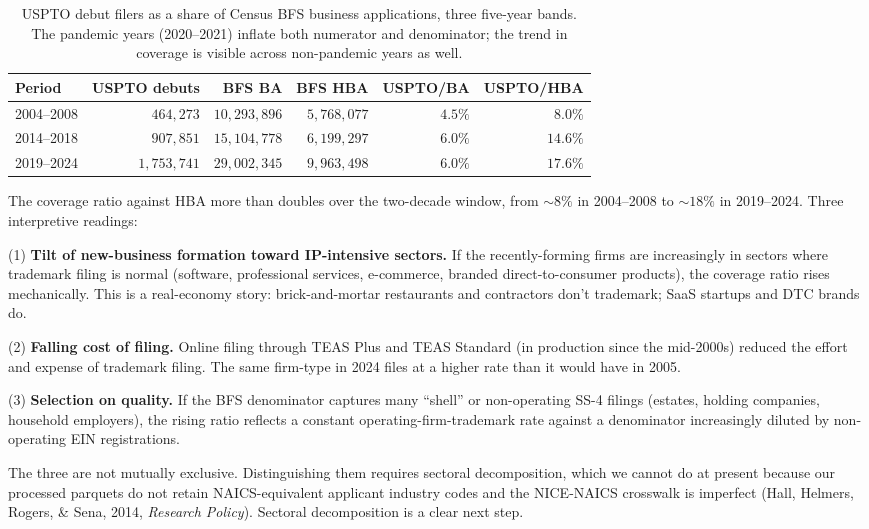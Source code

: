 \documentclass[11pt]{article}
\begin{document}
\begin{table}[h]
\centering
\small
\begin{tabular}{lrrrrr}
\toprule
Period & USPTO debuts & BFS BA & BFS HBA & USPTO/BA & USPTO/HBA \\
\midrule
2004--2008 &   $464{,}273$ & $10{,}293{,}896$ & $5{,}768{,}077$ & $4.5\%$ & $8.0\%$  \\
2014--2018 &   $907{,}851$ & $15{,}104{,}778$ & $6{,}199{,}297$ & $6.0\%$ & $14.6\%$ \\
2019--2024 & $1{,}753{,}741$ & $29{,}002{,}345$ & $9{,}963{,}498$ & $6.0\%$ & $17.6\%$ \\
\bottomrule
\end{tabular}
\caption{USPTO debut filers as a share of Census BFS business
applications, three five-year bands. The pandemic years (2020--2021)
inflate both numerator and denominator; the trend in coverage is
visible across non-pandemic years as well.}
\label{tab:coverage}
\end{table}

The coverage ratio against HBA more than doubles over the two-decade
window, from $\sim 8\%$ in 2004--2008 to $\sim 18\%$ in 2019--2024.
Three interpretive readings:

(1) \textbf{Tilt of new-business formation toward IP-intensive
sectors.} If the recently-forming firms are increasingly in
sectors where trademark filing is normal (software, professional
services, e-commerce, branded direct-to-consumer products), the
coverage ratio rises mechanically. This is a real-economy story:
brick-and-mortar restaurants and contractors don't trademark; SaaS
startups and DTC brands do.

(2) \textbf{Falling cost of filing.} Online filing through TEAS Plus
and TEAS Standard (in production since the mid-2000s) reduced the
effort and expense of trademark filing. The same firm-type in 2024
files at a higher rate than it would have in 2005.

(3) \textbf{Selection on quality.} If the BFS denominator captures
many ``shell'' or non-operating SS-4 filings (estates, holding
companies, household employers), the rising ratio reflects a
constant operating-firm-trademark rate against a denominator
increasingly diluted by non-operating EIN registrations.

The three are not mutually exclusive. Distinguishing them requires
sectoral decomposition, which we cannot do at present because our
processed parquets do not retain NAICS-equivalent applicant industry
codes and the NICE-NAICS crosswalk is imperfect (Hall, Helmers,
Rogers, \& Sena, 2014, \emph{Research Policy}). Sectoral
decomposition is a clear next step.
\end{document}

